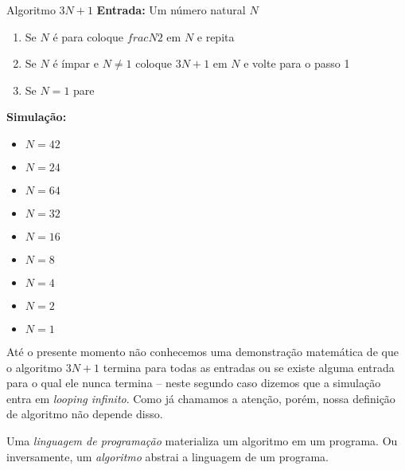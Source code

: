 \begin{example}{Algoritmo $3N+1$}
  \label{ex:euclides}
  {\bf Entrada:} Um número natural $N$

  \begin{enumerate}
  \item Se $N$ é para coloque $frac{N}{2}$ em $N$ e repita
  \item Se $N$ é ímpar e $N \neq 1$ coloque $3N+1$ em $N$ e volte para o passo 1
  \item Se $N = 1$ pare
  \end{enumerate}

  {\bf Simulação:}
  \begin{itemize}
  \item $N = 42$
  \item $N = 24$
  \item $N = 64$
  \item $N = 32$
  \item $N = 16$
  \item $N = 8$
  \item $N = 4$
  \item $N = 2$
  \item $N = 1$
  \end{itemize}
\end{example}

Até o presente momento não conhecemos uma demonstração matemática de que o algoritmo $3N+1$ termina para todas as entradas ou se existe alguma entrada para o qual ele nunca termina -- neste segundo caso dizemos que a simulação entra em {\em looping infinito}.
Como já chamamos a atenção, porém, nossa definição de algoritmo não depende disso.


Uma {\em linguagem de programação} materializa um algoritmo em um programa.
Ou inversamente, um {\em algoritmo} abstrai a linguagem de um programa.




